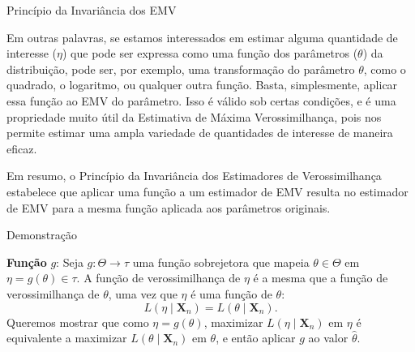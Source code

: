 \documentclass[12pt]{beamer}
\begin{document}
\begin{frame}{Princípio da Invariância dos EMV}
\begin{block}{}
\justifying
Em outras palavras, se estamos interessados em estimar alguma quantidade de interesse (\(\eta\)) que pode ser expressa como uma função dos parâmetros (\(\theta\)) da distribuição, pode ser, por exemplo, uma transformação do parâmetro $\theta$, como o quadrado, o logaritmo, ou qualquer outra função. Basta, simplesmente, aplicar essa função ao EMV do parâmetro. Isso é válido sob certas condições, e é uma propriedade muito útil da Estimativa de Máxima Verossimilhança, pois nos permite estimar uma ampla variedade de quantidades de interesse de maneira eficaz.
\end{block}
\pause
\begin{block}{}
\justifying
Em resumo, o Princípio da Invariância dos Estimadores de Verossimilhança estabelece que aplicar uma função a um estimador de EMV resulta no estimador de EMV para a mesma função aplicada aos parâmetros originais.
\end{block}
\end{frame}

\begin{frame}{Demonstração}
	\begin{block}{}
		\justifying
		\textbf{Função} \( g \): Seja \( g: \Theta \rightarrow \tau \) uma função sobrejetora que mapeia \( \theta \in \Theta \) em \( \eta = g(\theta) \in \tau \). A função de verossimilhança de \( \eta \) é a mesma que a função de verossimilhança de \( \theta \), uma vez que \( \eta \) é uma função de \( \theta \):
		\[
		L(\eta \mid \boldsymbol{X}_{n}) = L(\theta \mid \boldsymbol{X}_{n}).
		\]
		Queremos mostrar que como \( \eta = g(\theta) \), maximizar \( L(\eta \mid \boldsymbol{X}_{n}) \) em \( \eta \) é equivalente a maximizar \( L(\theta \mid \boldsymbol{X}_{n}) \) em \( \theta \), e então aplicar \( g \) ao valor \( \hat{\theta} \).
		
	\end{block}
\end{frame}
\end{document}

